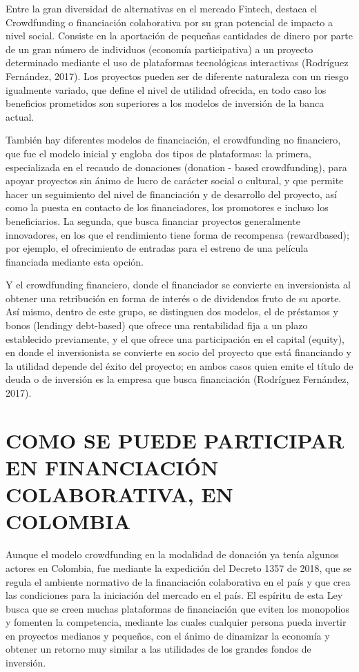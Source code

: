 \documentclass[
]{book}
\begin{document}
Entre la gran diversidad de alternativas en el mercado Fintech, destaca el Crowdfunding o financiación colaborativa por su gran potencial de impacto a nivel social. Consiste en la aportación de pequeñas cantidades de dinero por parte de un gran número de individuos (economía participativa) a un proyecto determinado mediante el uso de plataformas tecnológicas interactivas (Rodríguez Fernández, 2017). Los proyectos pueden ser de diferente naturaleza con un riesgo igualmente variado, que define el nivel de utilidad ofrecida, en todo caso los beneficios prometidos son superiores a los modelos de inversión de la banca actual.

También hay diferentes modelos de financiación, el crowdfunding no financiero, que fue el modelo inicial y engloba dos tipos de plataformas: la primera, especializada en el recaudo de donaciones (donation - based crowdfunding), para apoyar proyectos sin ánimo de lucro de carácter social o cultural, y que permite hacer un seguimiento del nivel de financiación y de desarrollo del proyecto, así como la puesta en contacto de los financiadores, los promotores e incluso los beneficiarios. La segunda, que busca financiar proyectos generalmente innovadores, en los que el rendimiento tiene forma de recompensa (rewardbased); por ejemplo, el ofrecimiento de entradas para el estreno de una película financiada mediante esta opción.

Y el crowdfunding financiero, donde el financiador se convierte en inversionista al obtener una retribución en forma de interés o de dividendos fruto de su aporte. Así mismo, dentro de este grupo, se distinguen dos modelos, el de préstamos y bonos (lendingy debt-based) que ofrece una rentabilidad fija a un plazo establecido previamente, y el que ofrece una participación en el capital (equity), en donde el inversionista se convierte en socio del proyecto que está financiando y la utilidad depende del éxito del proyecto; en ambos casos quien emite el título de deuda o de inversión es la empresa que busca financiación (Rodríguez Fernández, 2017).

\hypertarget{como-se-puede-participar-en-financiaciuxf3n-colaborativa-en-colombia}{%
\chapter{COMO SE PUEDE PARTICIPAR EN FINANCIACIÓN COLABORATIVA, EN COLOMBIA}\label{como-se-puede-participar-en-financiaciuxf3n-colaborativa-en-colombia}}

Aunque el modelo crowdfunding en la modalidad de donación ya tenía algunos actores en Colombia, fue mediante la expedición del Decreto 1357 de 2018, que se regula el ambiente normativo de la financiación colaborativa en el país y que crea las condiciones para la iniciación del mercado en el país. El espíritu de esta Ley busca que se creen muchas plataformas de financiación que eviten los monopolios y fomenten la competencia, mediante las cuales cualquier persona pueda invertir en proyectos medianos y pequeños, con el ánimo de dinamizar la economía y obtener un retorno muy similar a las utilidades de los grandes fondos de inversión.
\end{document}
